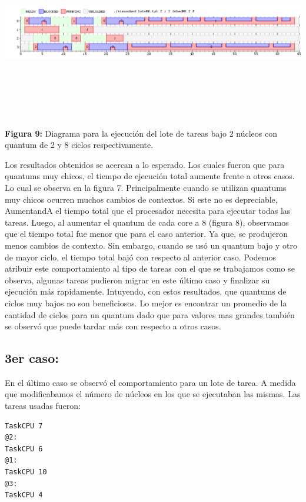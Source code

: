\documentclass[a4paper]{article}
\begin{document}
 \includegraphics[width=\textwidth,height=3.0in,keepaspectratio
]{imagenes/ej4/eje3.png} \newline
\begin {flushleft}
\textbf{Figura 9:} Diagrama para la ejecuci\'on del lote de tareas bajo 2 n\'ucleos con quantum de 2 y 8 ciclos respectivamente.
\end{flushleft}

Los resultados obtenidos se acercan a lo esperado. Los cuales fueron que para quantums muy chicos, el tiempo de ejecución total aumente frente a otros casos. Lo cual se observa en la figura 7. Principalmente cuando se utilizan quantums muy chicos ocurren muchos cambios de contextos. Si este no es depreciable, AumentandA el tiempo total que el procesador necesita para ejecutar todas las tareas. Luego, al aumentar el quantum de cada core a 8 (figura 8), observamos que el tiempo total fue menor que para el caso anterior. Ya que, se produjeron menos cambios de contexto. Sin embargo, cuando se usó un quantum bajo y otro de mayor ciclo, el tiempo total bajó con respecto al anterior caso. Podemos atribuir este comportamiento al tipo de tareas con el que se trabajamos como se observa, algunas tareas pudieron migrar en este último caso y finalizar su ejecución más rapidamente. Intuyendo, con estos resultados, que quantums de ciclos muy bajos no son beneficiosos. Lo mejor es encontrar un promedio de la cantidad de ciclos para un quantum dado que para valores mas grandes también se observó que puede tardar más con respecto a otros casos.   
 
 \subsection{3er caso:}
 
 En el último caso se observó el comportamiento para un lote  de tarea. A medida que modificabamos el número de núcleos en los que se ejecutaban las mismas.\newline
 Las tareas usadas fueron:
 \begin{codesnippet}
	\begin{verbatim}
TaskCPU 7
@2:
TaskCPU 6
@1:
TaskCPU 10
@3:
TaskCPU 4
	\end{verbatim}
	\end{codesnippet}
	
\end{document}
